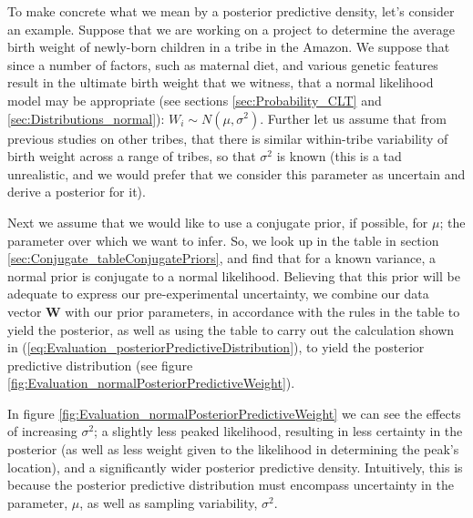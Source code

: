 \documentclass[11pt,fullpage]{book}
\begin{document}
To make concrete what we mean by a posterior predictive density, let's consider an example. Suppose that we are working on a project to determine the average birth weight of newly-born children in a tribe in the Amazon. We suppose that since a number of factors, such as maternal diet, and various genetic features result in the ultimate birth weight that we witness, that a normal likelihood model may be appropriate (see sections \ref{sec:Probability_CLT} and \ref{sec:Distributions_normal}): $W_i\sim N(\mu,\sigma^2)$. Further let us assume that from previous studies on other tribes, that there is similar within-tribe variability of birth weight across a range of tribes, so that $\sigma^2$ is known (this is a tad unrealistic, and we would prefer that we consider this parameter as uncertain and derive a posterior for it). 

Next we assume that we would like to use a conjugate prior, if possible, for $\mu$; the parameter over which we want to infer. So, we look up in the table in section \ref{sec:Conjugate_tableConjugatePriors}, and find that for a known variance, a normal prior is conjugate to a normal likelihood. Believing that this prior will be adequate to express our pre-experimental uncertainty, we combine our data vector $\boldsymbol{W}$ with our prior parameters, in accordance with the rules in the table to yield the posterior, as well as using the table to carry out the calculation shown in (\ref{eq:Evaluation_posteriorPredictiveDistribution}), to yield the posterior predictive distribution (see figure \ref{fig:Evaluation_normalPosteriorPredictiveWeight}).

In figure \ref{fig:Evaluation_normalPosteriorPredictiveWeight} we can see the effects of increasing $\sigma^2$; a slightly less peaked likelihood, resulting in less certainty in the posterior (as well as less weight given to the likelihood in determining the peak's location), and a significantly wider posterior predictive density. Intuitively, this is because the posterior predictive distribution must encompass uncertainty in the parameter, $\mu$, as well as sampling variability, $\sigma^2$. 
\end{document}
